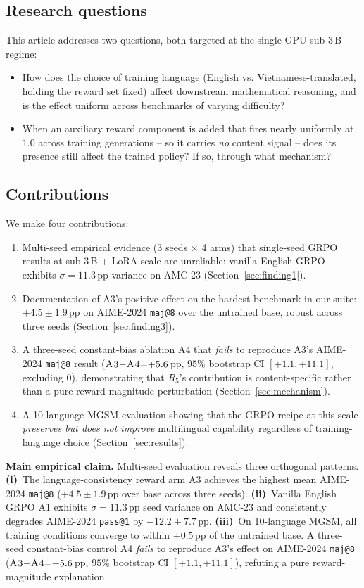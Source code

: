\documentclass[journal,onecolumn,11pt]{IEEEtran}
\newcommand{\armA}{\textsc{A1}}
\newcommand{\armC}{\textsc{A3}}
\newcommand{\armD}{\textsc{A4}}
\newcommand{\R}[1]{R_{#1}}
\newcommand{\boxedclaim}[1]{%
  \begin{tcolorbox}[colback=blue!4,colframe=blue!50!black,boxrule=0.5pt,%
                   left=4pt,right=4pt,top=4pt,bottom=4pt]%
  \small #1 \end{tcolorbox}}
\begin{document}
\subsection{Research questions}
This article addresses two questions, both targeted at the single-GPU
sub-3\,B regime:
\begin{itemize}
\item[\textbf{Q1.}] How does the choice of training language (English vs.
Vietnamese-translated, holding the reward set fixed) affect downstream
mathematical reasoning, and is the effect uniform across benchmarks of
varying difficulty?
\item[\textbf{Q2.}] When an auxiliary reward component is added that fires
nearly uniformly at $1.0$ across training generations -- so it carries
\emph{no} content signal -- does its presence still affect the trained
policy? If so, through what mechanism?
\end{itemize}

\subsection{Contributions}
We make four contributions:
\begin{enumerate}
\item Multi-seed empirical evidence (3 seeds $\times$ 4 arms) that
single-seed GRPO results at sub-3\,B + LoRA scale are unreliable: vanilla
English GRPO exhibits $\sigma{=}11.3$\,pp variance on AMC-23
(Section~\ref{sec:finding1}).
\item Documentation of \armC{}'s positive effect on the hardest benchmark
in our suite: $+4.5 \pm 1.9$\,pp on AIME-2024 \texttt{maj@8} over the
untrained base, robust across three seeds
(Section~\ref{sec:finding3}).
\item A three-seed constant-bias ablation \armD{} that \emph{fails} to
reproduce \armC{}'s AIME-2024 \texttt{maj@8} result
($\armC{}{-}\armD{}{=}{+}5.6$\,pp, $95\%$ bootstrap CI
$[+1.1, +11.1]$, excluding $0$), demonstrating that $\R{5}$'s
contribution is content-specific rather than a pure reward-magnitude
perturbation (Section~\ref{sec:mechanism}).
\item A 10-language MGSM evaluation showing that the GRPO recipe at this
scale \emph{preserves but does not improve} multilingual capability
regardless of training-language choice
(Section~\ref{sec:results}).
\end{enumerate}

\boxedclaim{%
\textbf{Main empirical claim.} Multi-seed evaluation reveals three
orthogonal patterns. \textbf{(i)}~The language-consistency reward arm
\armC{} achieves the highest mean AIME-2024 \texttt{maj@8}
($+4.5 \pm 1.9$\,pp over base across three seeds). \textbf{(ii)}~Vanilla
English GRPO \armA{} exhibits $\sigma{=}11.3$\,pp seed variance on
AMC-23 and consistently degrades AIME-2024 \texttt{pass@1} by
$-12.2 \pm 7.7$\,pp. \textbf{(iii)}~On 10-language MGSM, all training
conditions converge to within $\pm 0.5$\,pp of the untrained base. A
three-seed constant-bias control \armD{} \emph{fails} to reproduce
\armC{}'s effect on AIME-2024 \texttt{maj@8}
($\armC{}{-}\armD{}{=}{+}5.6$\,pp, $95\%$ bootstrap CI
$[+1.1, +11.1]$), refuting a pure reward-magnitude explanation.
}
\end{document}
